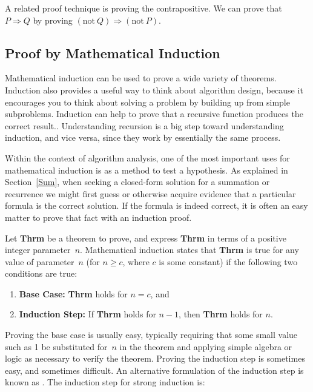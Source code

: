 A related proof technique is proving the contrapositive.
We can prove that \(P \Rightarrow Q\) by proving
\((\mathrm{not}\ Q) \Rightarrow (\mathrm{not}\ P)\).

\subsection{Proof by Mathematical Induction}
\label{Induct}

Mathematical
induction can be used to prove a wide variety of theorems.
Induction also provides a useful way to think about algorithm design,
because it encourages you to think about solving a problem by building
up from simple subproblems.
Induction can help to prove that a recursive function produces the
correct result..
Understanding recursion is a big step toward understanding induction,
and vice versa, since they work by essentially the same process.

Within the context of algorithm analysis, one of the most important
uses for mathematical induction is as a method to test a hypothesis.
As explained in Section~\ref{Sum}, when seeking a closed-form
solution for a summation or recurrence we might first guess or
otherwise acquire evidence that a particular formula is the correct
solution.
If the formula is indeed correct, it is often an easy matter to prove
that fact with an induction proof.

Let \textbf{Thrm} be a theorem to prove, and express \textbf{Thrm} in
terms of a positive integer parameter~\(n\).
Mathematical induction states that \textbf{Thrm} is true for any value
of parameter~\(n\) (for \(n \geq c\), where \(c\) is some constant)
if the following two conditions are true:

\begin{enumerate}

\item
\textbf{Base Case:} \textbf{Thrm} holds for \(n = c\), and

\item
\textbf{Induction Step:}
If \textbf{Thrm} holds for \(n - 1\), then \textbf{Thrm} holds for \(n\).
\end{enumerate}

Proving the base case is usually easy, typically requiring that some
small value such as 1 be substituted for~\(n\) in the theorem and
applying simple algebra or logic as necessary to verify the theorem.
Proving the induction step is sometimes easy, and sometimes difficult.
An alternative formulation of the induction step is known as
.
The induction step for strong induction is:

